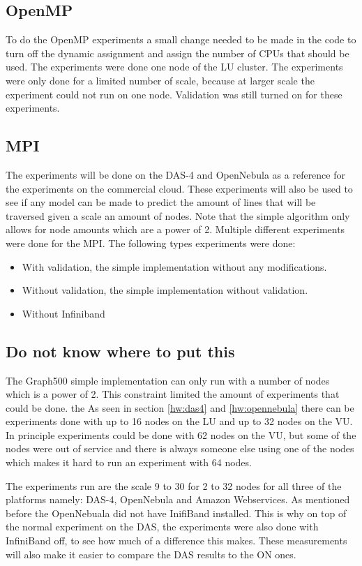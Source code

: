 \subsection{OpenMP}
To do the OpenMP experiments a small change needed to be made in the code to turn off the dynamic assignment and assign the number of CPUs that should be used. The experiments were done one node of the LU cluster. The experiments were only done for a limited number of scale, because at larger scale the experiment could not run on one node. Validation was still turned on for these experiments.

\subsection{MPI}
The experiments will be done on the DAS-4 and OpenNebula as a reference for the experiments on the commercial cloud. These experiments will also be used to see if any model can be made to predict the amount of lines that will be traversed given a scale an amount of nodes. Note that the simple algorithm only allows for node amounts which are a power of 2. Multiple different experiments were done for the MPI. The following types experiments were done:
\begin{itemize}
	\item With validation, the simple implementation without any modifications.
	\item Without validation, the simple implementation without validation.
	\item Without Infiniband
\end{itemize}

    
\subsection{Do not know where to put this}

 The Graph500 simple implementation can only run with a number of nodes which is a power of 2. This constraint limited the amount of experiments that could be done. the As seen in section \ref{hw:das4} and \ref{hw:opennebula} there can be experiments done with up to 16 nodes on the LU and up to 32 nodes on the VU. In principle experiments could be done with 62 nodes on the VU, but some of the nodes were out of service and there is always someone else using one of the nodes which makes it hard to run an experiment with 64 nodes.

The experiments run are the scale 9 to 30 for 2 to 32 nodes for all three of the platforms namely: DAS-4, OpenNebula and Amazon Webservices. As mentioned before the OpenNebuala did not have InifiBand installed. This is why on top of the normal experiment on the DAS, the experiments were also done with InfiniBand off, to see how much of a difference this makes. These measurements will also make it easier to compare the DAS results to the ON ones.  
    
